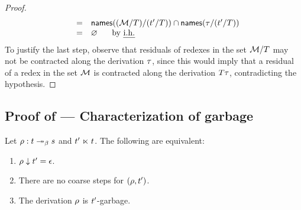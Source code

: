 \begin{proof}
\[\begin{array}{rcll}
  & = & \mathsf{names}((\mathcal{M}/T)/(t'/T)) \cap \mathsf{names}(\tau/(t'/T)) \\
  & = & \varnothing \hspace{.5cm}\text{ by {\em i.h.}} \\
  \end{array}
\]
To justify the last step, observe that residuals of redexes in the set $\mathcal{M}/T$
may not be contracted along the derivation $\tau$,
since this would imply that a residual of a redex in the set $\mathcal{M}$
is contracted along the derivation $T\tau$,
contradicting the hypothesis.
\end{proof}

\subsection*{Proof of  --- Characterization of garbage}
\label{characterization_of_garbage_proof}
Let $\rho : t \mathrel{\twoheadrightarrow_\beta} s$ and $t' \mathrel{\ltimes} t$.
The following are equivalent:
\begin{enumerate}
\item $\rho \downarrow t' = \epsilon$.
\item There are no coarse steps for $(\rho,t')$.
\item The derivation $\rho$ is $t'$-garbage.
\end{enumerate}
